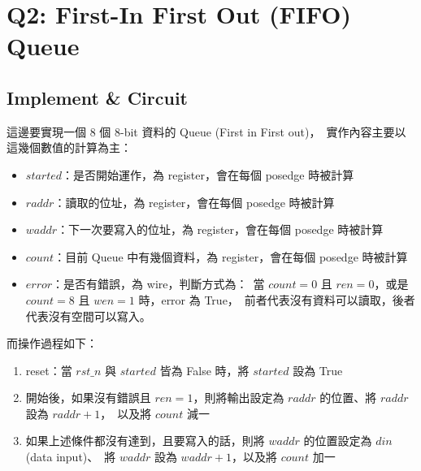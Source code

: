\documentclass[10.5pt,compsoc,UTF8]{CjC}
\theoremstyle{mystyle}
\begin{document}
\section{Q2: First-In First Out (FIFO) Queue}
\label{sec:Q2}

\subsection{Implement \& Circuit}

這邊要實現一個 8 個 8-bit 資料的 Queue (First in First out)，\
實作內容主要以這幾個數值的計算為主：
\begin{itemize}
  \item $started$：是否開始運作，為 register，會在每個 posedge 時被計算
  \item $raddr$：讀取的位址，為 register，會在每個 posedge 時被計算
  \item $waddr$：下一次要寫入的位址，為 register，會在每個 posedge 時被計算
  \item $count$：目前 Queue 中有幾個資料，為 register，會在每個 posedge 時被計算
  \item $error$：是否有錯誤，為 wire，判斷方式為：\
  當 $count = 0$ 且 $ren = 0$，或是 $count = 8$ 且 $wen = 1$ 時，error 為 True，\
  前者代表沒有資料可以讀取，後者代表沒有空間可以寫入。
\end{itemize}

而操作過程如下：
\begin{enumerate}
  \item reset：當 $rst\_n$ 與 $started$ 皆為 False 時，將 $started$ 設為 True
  \item 開始後，如果沒有錯誤且 $ren = 1$，則將輸出設定為 $raddr$ 的位置、將 $raddr$ 設為 $raddr + 1$，\
  以及將 $count$ 減一
  \item 如果上述條件都沒有達到，且要寫入的話，則將 $waddr$ 的位置設定為 $din$ (data input)、\
  將 $waddr$ 設為 $waddr + 1$，以及將 $count$ 加一
\end{enumerate}

\newpage
\end{document}
